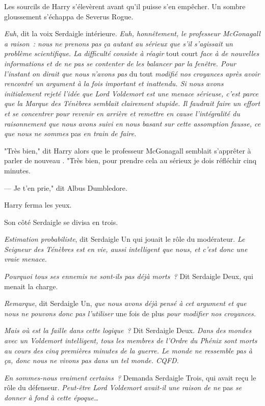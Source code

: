 Les sourcils de Harry s'élevèrent avant qu'il puisse s'en empêcher. Un sombre gloussement s'échappa de Severus Rogue.

\emph{Euh}, dit la voix Serdaigle intérieure. \emph{Euh, honnêtement, le professeur McGonagall a raison~: nous ne prenons pas ça autant au sérieux que s'il s'agissait un problème scientifique. La difficulté consiste à réagir} tout court \emph{face à de nouvelles informations et de ne pas se contenter de les balancer par la fenêtre. Pour l'instant on dirait que nous n'avons pas} du tout \emph{modifié nos croyances après avoir rencontré un argument à la fois important et inattendu. Si nous avons initialement rejeté l'idée que Lord Voldemort est une menace sérieuse, c'est parce que la Marque des Ténèbres semblait clairement stupide. Il faudrait faire un effort et se concentrer pour revenir en arrière et remettre en cause l'intégralité du raisonnement que nous avons suivi en nous basant sur cette assomption fausse, ce que nous ne sommes} pas \emph{en train de faire.}

"Très bien," dit Harry alors que le professeur McGonagall semblait s'apprêter à parler de nouveau . "Très bien, pour prendre cela au sérieux je dois réfléchir cinq minutes.

--- Je t'en prie," dit Albus Dumbledore.

Harry ferma les yeux.

Son côté Serdaigle se divisa en trois.

\emph{Estimation probabiliste}, dit Serdaigle Un qui jouait le rôle du modérateur. \emph{Le Seigneur des Ténèbres est en vie, aussi intelligent que nous, et c'est donc une vraie menace.}

\emph{Pourquoi tous ses ennemis ne sont-ils pas déjà morts~?} Dit Serdaigle Deux, qui menait la charge.

\emph{Remarque}, dit Serdaigle Un, \emph{que nous avons déjà pensé à cet argument et que nous ne pouvons donc pas l'utiliser} une fois de plus \emph{pour modifier nos croyances.}

\emph{Mais où est la faille dans cette logique~?} Dit Serdaigle Deux. \emph{Dans des mondes avec un Voldemort intelligent, tous les membres de l'Ordre du Phénix sont morts au cours des cinq premières minutes de la guerre. Le monde ne ressemble pas à ça, donc nous ne vivons pas dans un tel monde. CQFD.}

\emph{En sommes-nous vraiment certains~?} Demanda Serdaigle Trois, qui avait reçu le rôle du défenseur. \emph{Peut-être Lord Voldemort avait-il une raison de ne} pas \emph{se donner à fond à cette époque…}

